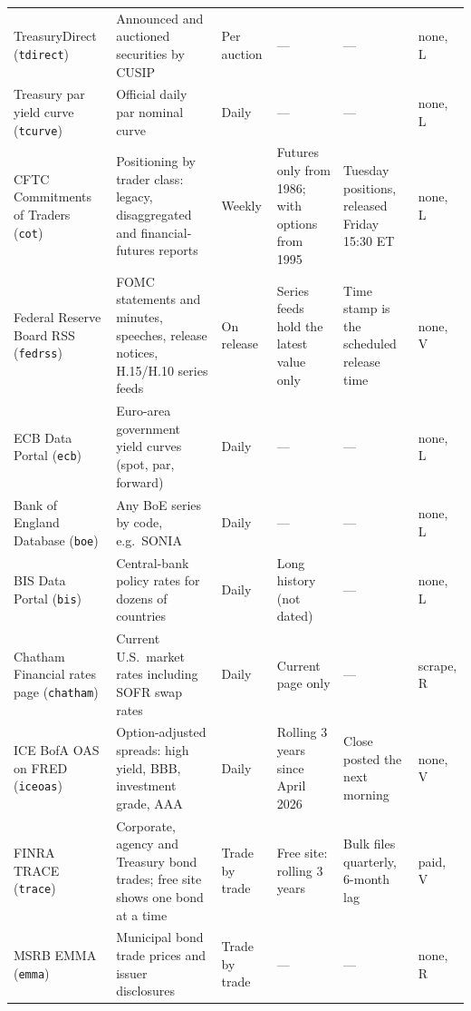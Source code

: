 \documentclass[10pt, a4paper, twocolumn]{article}
\newcommand{\sid}[1]{\texttt{\small #1}}   %
\newcommand{\ns}{---}                        %
\begin{document}
{\begin{longtable}{@{}L{3.1cm}L{4.65cm}L{1.85cm}L{2.5cm}L{2.7cm}L{1.35cm}@{}}
TreasuryDirect (\sid{tdirect}) & Announced and auctioned securities by CUSIP & Per auction & \ns & \ns & none, L \\
Treasury par yield curve (\sid{tcurve}) & Official daily par nominal curve & Daily & \ns & \ns & none, L \\
CFTC Commitments of Traders (\sid{cot}) & Positioning by trader class: legacy, disaggregated and financial-futures reports & Weekly & Futures only from 1986; with options from 1995 & Tuesday positions, released Friday 15:30 ET & none, L \\
Federal Reserve Board RSS (\sid{fedrss}) & FOMC statements and minutes, speeches, release notices, H.15/H.10 series feeds & On release & Series feeds hold the latest value only & Time stamp is the scheduled release time & none, V \\
ECB Data Portal (\sid{ecb}) & Euro-area government yield curves (spot, par, forward) & Daily & \ns & \ns & none, L \\
Bank of England Database (\sid{boe}) & Any BoE series by code, e.g.\ SONIA & Daily & \ns & \ns & none, L \\
BIS Data Portal (\sid{bis}) & Central-bank policy rates for dozens of countries & Daily & Long history (not dated) & \ns & none, L \\
Chatham Financial rates page (\sid{chatham}) & Current U.S.\ market rates including SOFR swap rates & Daily & Current page only & \ns & scrape, R \\
ICE BofA OAS on FRED (\sid{iceoas}) & Option-adjusted spreads: high yield, BBB, investment grade, AAA & Daily & Rolling 3 years since April 2026 & Close posted the next morning & none, V \\
FINRA TRACE (\sid{trace}) & Corporate, agency and Treasury bond trades; free site shows one bond at a time & Trade by trade & Free site: rolling 3 years & Bulk files quarterly, 6-month lag & paid, V \\
MSRB EMMA (\sid{emma}) & Municipal bond trade prices and issuer disclosures & Trade by trade & \ns & \ns & none, R \\
\end{longtable}
}
\end{document}
